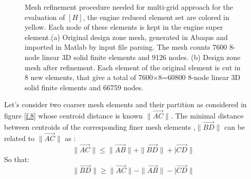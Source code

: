   \begin{figure}[hbt!]
  \centering
       \caption{Mesh refinement procedure needed for multi-grid approach for the evaluation of $\left[H\right]$, the engine reduced element set are colored in yellow. Each node of these elements is kept in the engine super element.(a) Original design zone mesh, generated in Abaqus and imported in Matlab by input file parsing. The mesh counts 7600 8-node linear 3D solid finite elements and 9126 nodes. (b) Design zone mesh after refinement. Each element of the original element is cut in 8 new elements, that give a total of 7600$\times$8=60800 8-node linear 3D solid finite elements and  66759 nodes. }
       \label{f.7}
     \end{figure}
 Let's consider two coarser mesh elements and their partition as considered in figure \ref{f.8} whose centroid distance is known $\|\vec{AC}\|$. The minimal distance between centroids of the corresponding finer mesh elements ,$\|\vec{BD}\|$ can be related to $\|\vec{AC}\|$ as :
  \begin{equation}
  \label{e.12}
  \|\vec{AC}\|\leq\|\vec{AB}\|+\|\vec{BD}\|+|\vec{CD}\|
  \end{equation}
 So that:
  \begin{equation}
  \label{e.13}
  \|\vec{BD}\|\geq \|\vec{AC}\|-\|\vec{AB}\|-|\vec{CD}\|
  \end{equation}
